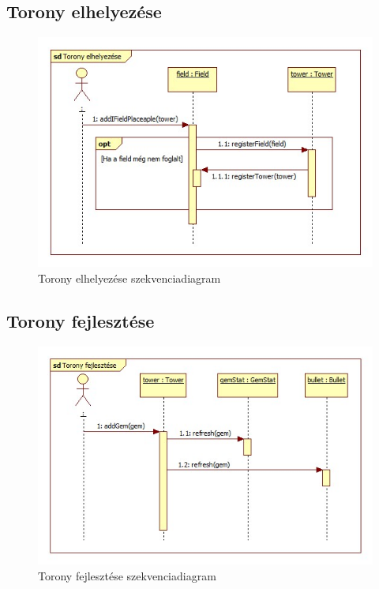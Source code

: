 \subsection{Torony elhelyezése}
\begin{figure}[H]
\begin{center}
\includegraphics[width=17cm]{chapters/chapter03/images/Torony_elhelyezese.jpg}
\caption{Torony elhelyezése szekvenciadiagram}
\label{fig:Torony_elhelyezése}
\end{center}
\end{figure}

\subsection{Torony fejlesztése}
\begin{figure}[H]
\begin{center}
\includegraphics[width=17cm]{chapters/chapter03/images/Torony_fejlesztese.jpg}
\caption{Torony fejlesztése szekvenciadiagram}
\label{fig:Torony_fejlesztése}
\end{center}
\end{figure}

